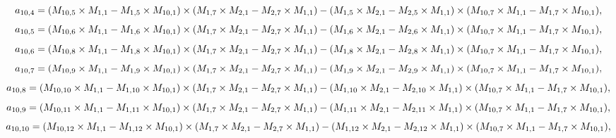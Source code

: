 \documentclass[10pt]{asme2ej}
\begin{document}
\begin{landscape}
\begin{equation}
    a_{10,4} = (M_{10,5}\times M_{1,1}-M_{1,5}\times M_{10,1})\times (M_{1,7}\times M_{2,1}-M_{2,7}\times M_{1,1})\\-(M_{1,5}\times M_{2,1}-M_{2,5}\times M_{1,1})\times (M_{10,7}\times M_{1,1}-M_{1,7}\times M_{10,1}),
\end{equation}
\begin{equation}
    a_{10,5} = (M_{10,6}\times M_{1,1}-M_{1,6}\times M_{10,1})\times (M_{1,7}\times M_{2,1}-M_{2,7}\times M_{1,1})\\-(M_{1,6}\times M_{2,1}-M_{2,6}\times M_{1,1})\times (M_{10,7}\times M_{1,1}-M_{1,7}\times M_{10,1}),
\end{equation}
\begin{equation}
    a_{10,6} = (M_{10,8}\times M_{1,1}-M_{1,8}\times M_{10,1})\times (M_{1,7}\times M_{2,1}-M_{2,7}\times M_{1,1})\\-(M_{1,8}\times M_{2,1}-M_{2,8}\times M_{1,1})\times (M_{10,7}\times M_{1,1}-M_{1,7}\times M_{10,1}),
\end{equation}
\begin{equation}
    a_{10,7} = (M_{10,9}\times M_{1,1}-M_{1,9}\times M_{10,1})\times (M_{1,7}\times M_{2,1}-M_{2,7}\times M_{1,1})\\-(M_{1,9}\times M_{2,1}-M_{2,9}\times M_{1,1})\times (M_{10,7}\times M_{1,1}-M_{1,7}\times M_{10,1}),
\end{equation}
\begin{equation}
    a_{10,8} = (M_{10,10}\times M_{1,1}-M_{1,10}\times M_{10,1})\times (M_{1,7}\times M_{2,1}-M_{2,7}\times M_{1,1})\\-(M_{1,10}\times M_{2,1}-M_{2,10}\times M_{1,1})\times (M_{10,7}\times M_{1,1}-M_{1,7}\times M_{10,1}),
\end{equation}
\begin{equation}
    a_{10,9} = (M_{10,11}\times M_{1,1}-M_{1,11}\times M_{10,1})\times (M_{1,7}\times M_{2,1}-M_{2,7}\times M_{1,1})\\-(M_{1,11}\times M_{2,1}-M_{2,11}\times M_{1,1})\times (M_{10,7}\times M_{1,1}-M_{1,7}\times M_{10,1}),
\end{equation}
\begin{equation}
    a_{10,10} = (M_{10,12}\times M_{1,1}-M_{1,12}\times M_{10,1})\times (M_{1,7}\times M_{2,1}-M_{2,7}\times M_{1,1})\\-(M_{1,12}\times M_{2,1}-M_{2,12}\times M_{1,1})\times (M_{10,7}\times M_{1,1}-M_{1,7}\times M_{10,1}),
\end{equation}


\end{landscape}
\end{document}

